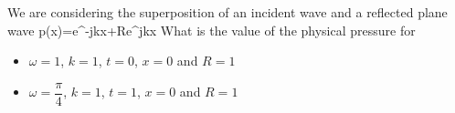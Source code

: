 \bexo
We are considering the superposition of an incident wave and a reflected plane wave
\be
p(x)=e^{-jkx}+Re^{jkx}
\ee 
What is the value of the physical pressure for
\begin{itemize}
\item $\omega=1$, $k=1$, $t=0$, $x=0$ and $R=1$
\item $\omega=\dfrac{\pi}{4}$, $k=1$, $t=1$, $x=0$ and $R=1$
\end{itemize}
\eexo


